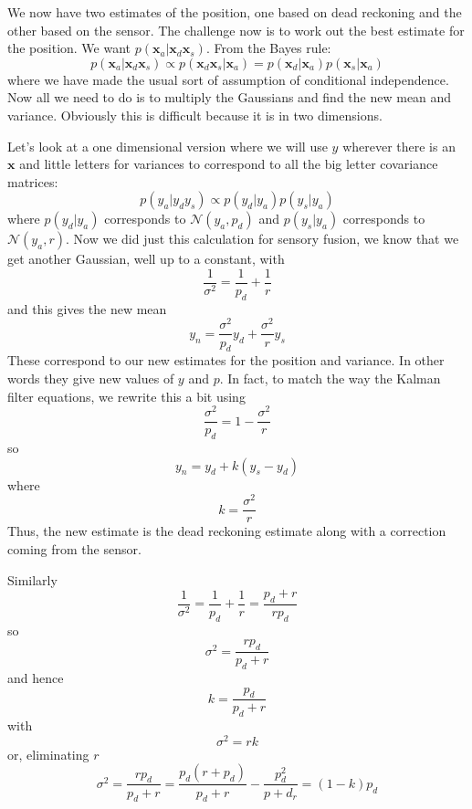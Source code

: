 \documentclass[12pt]{article}
\begin{document}
We now have two estimates of the position, one based on dead reckoning
and the other based on the sensor. The challenge now is to work out
the best estimate for the position. We want
$p(\mathbf{x}_a|\mathbf{x}_d\mathbf{x}_s)$. From the Bayes rule:
\begin{equation}
p(\mathbf{x}_a|\mathbf{x}_d\mathbf{x}_s)\propto p(\mathbf{x}_d\mathbf{x}_s|\mathbf{x}_a)=p(\mathbf{x}_d|\mathbf{x}_a)p(\mathbf{x}_s|\mathbf{x}_a)
\end{equation}
where we have made the usual sort of assumption of conditional
independence. Now all we need to do is to multiply the Gaussians and
find the new mean and variance. Obviously this is difficult because it
is in two dimensions. 

Let's look at a one dimensional version where we will use $y$ wherever
there is an $\mathbf{x}$ and little letters for variances to correspond
to all the big letter covariance matrices:
\begin{equation}
p(y_a|y_dy_s)\propto p(y_d|y_a)p(y_s|y_a)
\end{equation}
where $p(y_d|y_a)$ corresponds to $\mathcal{N}(y_a,p_d)$ and
$p(y_s|y_a)$ corresponds to $\mathcal{N}(y_a,r)$. Now we did just this calculation for sensory fusion, we know that we get another Gaussian, well up to a constant, with 
\begin{equation}
\frac{1}{\sigma^2}=\frac{1}{p_d}+\frac{1}{r}
\end{equation}
and this gives the new mean
\begin{equation}
y_n=\frac{\sigma^2}{p_d}y_d+\frac{\sigma^2}{r}y_s
\end{equation}
These correspond to our new estimates for the position and
variance. In other words they give new values of $y$ and $p$. In fact, to match the way the Kalman filter equations, we rewrite this a bit using
\begin{equation}
\frac{\sigma^2}{p_d}=1-\frac{\sigma^2}{r}
\end{equation}
so
\begin{equation}
y_n=y_d+k(y_s-y_d)
\end{equation}
where
\begin{equation}
k=\frac{\sigma^2}{r}
\end{equation}
Thus, the new estimate is the dead reckoning estimate along with a correction coming from the sensor. 

Similarly
\begin{equation}
\frac{1}{\sigma^2}=\frac{1}{p_d}+\frac{1}{r}=\frac{p_d+r}{rp_d}
\end{equation}
so 
\begin{equation}
\sigma^2=\frac{rp_d}{p_d+r}
\end{equation}
and hence
\begin{equation}
k=\frac{p_d}{p_d+r}
\end{equation}
with
\begin{equation}
\sigma^2=rk
\end{equation}
or, eliminating $r$
\begin{equation}
\sigma^2=\frac{rp_d}{p_d+r}=\frac{p_d(r+p_d)}{p_d+r}-\frac{p_d^2}{p+d_r}=(1-k)p_d
\end{equation}
\end{document}
